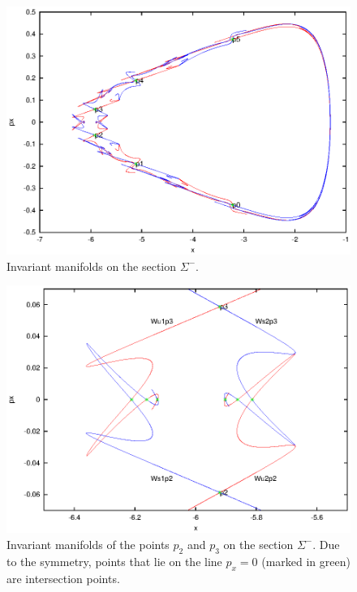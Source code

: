 \begin{figure}
\includegraphics{figs/invmfld2}
\caption{Invariant manifolds on the section $\Sigma^-$.}
\label{fig:invmfld2}
\end{figure}

\begin{figure}
\includegraphics{figs/invmfld2_it23}
\caption{Invariant manifolds of the points $p_2$ and $p_3$ on the
section $\Sigma^-$. Due to the symmetry, points that lie on the line
$p_x=0$ (marked in green) are intersection points.}
\label{fig:invmfld2_it23}
\end{figure}



